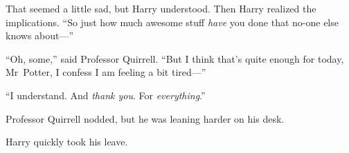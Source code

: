 That seemed a little sad, but Harry understood. Then Harry realized the implications.
“So just how much awesome stuff \emph{have} you done that no-one else knows about—”

“Oh, some,” said Professor Quirrell.
“But I think that’s quite enough for today, Mr~Potter, I confess I am feeling a bit tired—”

“I understand. And \emph{thank you}. For \emph{everything}.”

Professor Quirrell nodded, but he was leaning harder on his desk.

Harry quickly took his leave.

